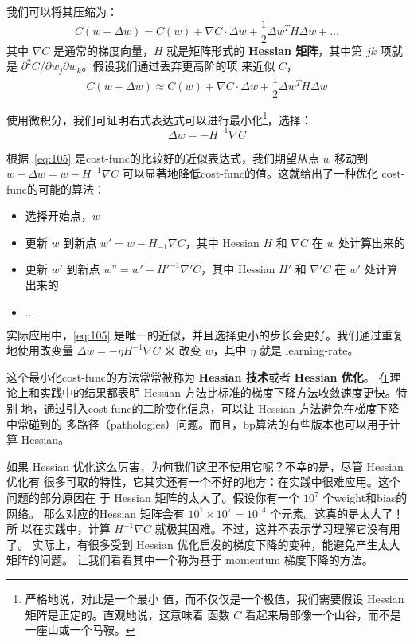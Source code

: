 我们可以将其压缩为：
\begin{equation}
  C(w+\Delta w) = C(w) + \nabla C \cdot \Delta w +
  \frac{1}{2} \Delta w^T H \Delta w + \ldots
  \label{eq:104}\tag{104}
\end{equation}
其中 $\nabla C$ 是通常的梯度向量，$H$ 就是矩阵形式的 \textbf{Hessian 矩阵}，其中第
$jk$ 项就是 $\partial^2 C/\partial w_j\partial w_k$。假设我们通过丢弃更高阶的项
来近似 $C$，
\begin{equation} 
  C(w+\Delta w) \approx C(w) + \nabla C \cdot \Delta w +
  \frac{1}{2} \Delta w^T H \Delta w
  \label{eq:105}\tag{105}
\end{equation}

使用微积分，我们可证明右式表达式可以进行最小化\footnote{严格地说，对此是一个最小
  值，而不仅仅是一个极值，我们需要假设 Hessian 矩阵是正定的。直观地说，这意味着
  函数 $C$ 看起来局部像一个山谷，而不是一座山或一个马鞍。}，选择：
\begin{equation}
  \Delta w = -H^{-1} \nabla C
  \label{eq:106}\tag{106}
\end{equation}

根据~\eqref{eq:105} 是\gls*{cost-func}的比较好的近似表达式，我们期望从点 $w$ 移动到
$w+\Delta w = w - H^{-1}\nabla C$ 可以显著地降低\gls*{cost-func}的值。这就给出了一种优化
\gls*{cost-func}的可能的算法：
\begin{itemize}
\item 选择开始点，$w$
\item 更新 $w$ 到新点 $w' = w - H_{-1}\nabla C$，其中 Hessian $H$ 和 $\nabla C$
  在 $w$ 处计算出来的
\item 更新 $w'$ 到新点 $w” = w' - H'^{-1}\nabla' C$，其中 Hessian $H'$ 和
  $\nabla' C$ 在 $w'$ 处计算出来的
\item $\ldots$
\end{itemize}

实际应用中，\eqref{eq:105} 是唯一的近似，并且选择更小的步长会更好。我们通过重复
地使用改变量 $\Delta w = -\eta H^{-1} \nabla C$ 来 改变 $w$，其中 $\eta$ 就是
\gls*{learning-rate}。

这个最小化\gls*{cost-func}的方法常常被称为 \textbf{Hessian 技术}或者 \textbf{Hessian 优化}。
在理论上和实践中的结果都表明 Hessian 方法比标准的梯度下降方法收敛速度更快。特别
地，通过引入\gls*{cost-func}的二阶变化信息，可以让 Hessian 方法避免在梯度下降中常碰到的
多路径（pathologies）问题。而且，\gls*{bp}算法的有些版本也可以用于计算 Hessian。

如果 Hessian 优化这么厉害，为何我们这里不使用它呢？不幸的是，尽管 Hessian 优化有
很多可取的特性，它其实还有一个不好的地方：在实践中很难应用。这个问题的部分原因在
于 Hessian 矩阵的太大了。假设你有一个 $10^7$ 个\gls*{weight}和\gls*{bias}的网络。
那么对应的Hessian 矩阵会有 $10^7 \times 10^7=10^{14}$ 个元素。这真的是太大了！所
以在实践中，计算 $H^{-1}\nabla C$ 就极其困难。不过，这并不表示学习理解它没有用了。
实际上，有很多受到 Hessian 优化启发的梯度下降的变种，能避免产生太大矩阵的问题。
让我们看看其中一个称为基于 momentum 梯度下降的方法。\\

